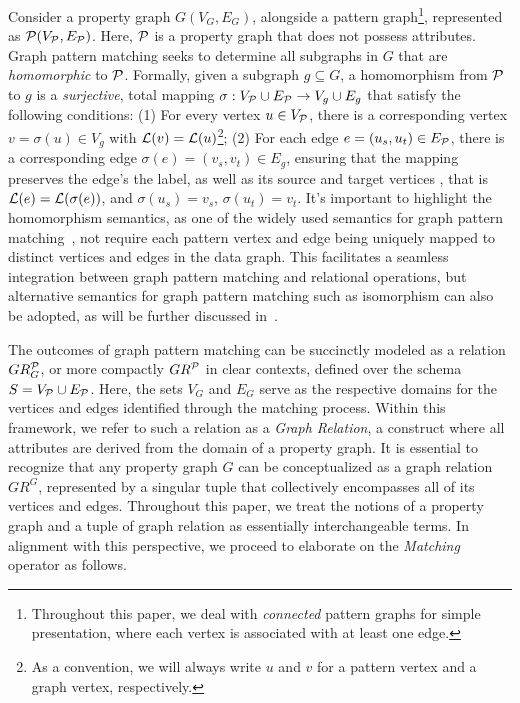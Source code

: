 Consider a property graph \(G(V_G, E_G)\), alongside a pattern graph\footnote{Throughout this paper, we deal with \emph{connected} pattern graphs for simple presentation, where each vertex is associated with at least one edge.}, represented as \(\mathcal{P}(V_{\mathcal{P}}, E_{\mathcal{P}})\). Here, \(\mathcal{P}\) is a property graph that does not possess attributes.
Graph pattern matching seeks to determine all subgraphs in \(G\) that are \emph{homomorphic} to \(\mathcal{P}\).
Formally, given a subgraph $g \subseteq G$, a homomorphism from \(\mathcal{P}\) to \(g\) is a \emph{surjective}, total mapping \(\sigma: V_{\mathcal{P}} \cup E_{\mathcal{P}} \to V_{g} \cup E_{g}\) that satisfy the following conditions: (1) For every vertex \(u \in V_{\mathcal{P}}\), there is a corresponding vertex \(v = \sigma(u) \in V_{g}\) with \(\mathcal{L}(v) = \mathcal{L}(u)\)\footnote{As a convention, we will always write $u$ and $v$ for a pattern vertex and a graph vertex, respectively.}; (2) For each edge \(e = (u_s, u_t) \in E_{\mathcal{P}}\), there is a corresponding edge \(\sigma(e) = (v_s, v_t) \in E_{g}\), ensuring that the mapping preserves the edge's the label, as well as its source and target vertices , that is \(\mathcal{L}(e) = \mathcal{L}(\sigma(e))\), and \(\sigma(u_s) = v_s\), \(\sigma(u_t) = v_t\). It's important to highlight the homomorphism semantics, as one of the widely used semantics for graph pattern matching~\cite{angles2017foundations},  not require each pattern vertex and edge being uniquely mapped to distinct vertices and edges in the data graph. This facilitates a seamless integration between graph pattern matching and relational operations, but alternative semantics for graph pattern matching such as isomorphism can also be adopted, as will be further discussed in~.

The outcomes of graph pattern matching can be succinctly modeled as a relation \(GR_G^{\mathcal{P}}\), or more compactly \(GR^{\mathcal{P}}\) in clear contexts, defined over the schema \(S = V_{\mathcal{P}} \cup E_{\mathcal{P}}\). Here, the sets \(V_G\) and \(E_G\) serve as the respective domains for the vertices and edges identified through the matching process. Within this framework, we refer to such a relation as a \emph{Graph Relation}, a construct where all attributes are derived from the domain of a property graph.
It is essential to recognize that any property graph \(G\) can be conceptualized as a graph relation \(GR^G\), represented by a singular tuple that collectively encompasses all of its vertices and edges. Throughout this paper, we treat the notions of a property graph and a tuple of graph relation as essentially interchangeable terms. In alignment with this perspective, we proceed to elaborate on the \emph{Matching} operator as follows.

